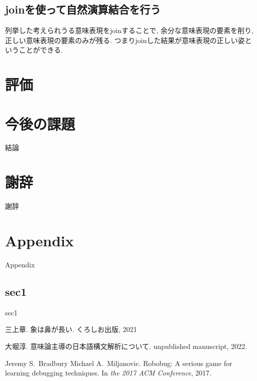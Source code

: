 \documentclass{jreport}
\begin{document}
\section{joinを使って自然演算結合を行う}
列挙した考えられうる意味表現をjoinすることで, 余分な意味表現の要素を削り, 正しい意味表現の要素のみが残る.
つまりjoinした結果が意味表現の正しい姿ということができる.

\chapter{評価}

\chapter{今後の課題}
結論

\chapter*{謝辞}
{謝辞}

\appendix
\chapter{Appendix}
Appendix
\section{sec1}
sec1


% 
% 

\begin{thebibliography}{10}

三上章.
\newblock 象は鼻が長い.
\newblock くろしお出版, 2021

大堀淳.
\newblock 意味論主導の日本語構文解析について.
\newblock unpublished manuscript, 2022.

Jeremy S.~Bradbury Michael A.~Miljanovic.
\newblock Robobug: A serious game for learning debugging techniques.
\newblock In {\em the 2017 ACM Conference}, 2017.

\end{thebibliography}
\end{document}
